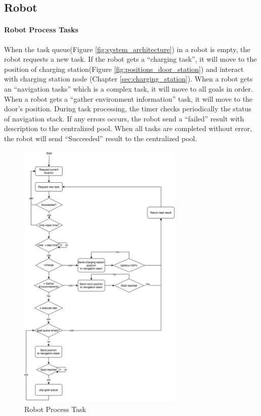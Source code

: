 \subsection{Robot}

\paragraph{Robot Process Tasks}
When the task queue(Figure \ref{fig:system_architecture}) in a robot is empty, the robot requests a new task. If the robot gets a ``charging task'', it will move to the position of charging station(Figure \ref{fig:positions_door_station}) and interact with charging station node (Chapter \ref{sec:charging_station}).
When a robot gets an ``navigation tasks'' which is a complex task, it will move to all goals in order.
When a robot gets a ``gather environment information'' task, it will move to the door's position.
During task processing, the timer checks periodically the status of navigation stack. If any errors occurs, the robot send a ``failed'' result with description to the centralized pool.  
When all tasks are completed without error, the robot will send ``Succeeded'' result to the centralized pool.


\begin{figure}[htbp]
    \centering
    \includegraphics[width = 0.7\textwidth]{content/images/ch4/robot_process_task.drawio.png}
    \caption{Robot Process Task }
    \label{fig:task_process_robot}
\end{figure}


